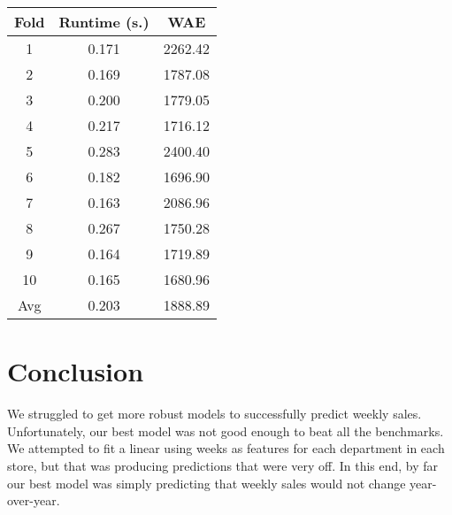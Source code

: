 \documentclass{article}
\begin{document}
\begin{center}
    \begin{tabular}{|c|c|c|}
        \hline
        Fold & Runtime (s.) & WAE \\ 
        \hline \hline 
        1 & 0.171 & 2262.42 \\ 
        \hline
        2 & 0.169 & 1787.08 \\ 
        \hline
        3 & 0.200 & 1779.05 \\ 
        \hline
        4 & 0.217 & 1716.12 \\ 
        \hline
        5 & 0.283 & 2400.40 \\ 
        \hline
        6 & 0.182 & 1696.90 \\ 
        \hline
        7 & 0.163 & 2086.96 \\ 
        \hline
        8 & 0.267 & 1750.28 \\ 
        \hline
        9 & 0.164 & 1719.89 \\ 
        \hline
        10 & 0.165 & 1680.96 \\ 
        \hline
        Avg & 0.203 & 1888.89 \\ 
        \hline 
    \end{tabular}
\end{center}


\section{Conclusion}

We struggled to get more robust models to successfully predict weekly sales. Unfortunately, our best model was not good enough to beat all the benchmarks. We attempted to fit a linear using weeks as features for each department in each store, but that was producing predictions that were very off. In this end, by far our best model was simply predicting that weekly sales would not change year-over-year. 
\end{document}
